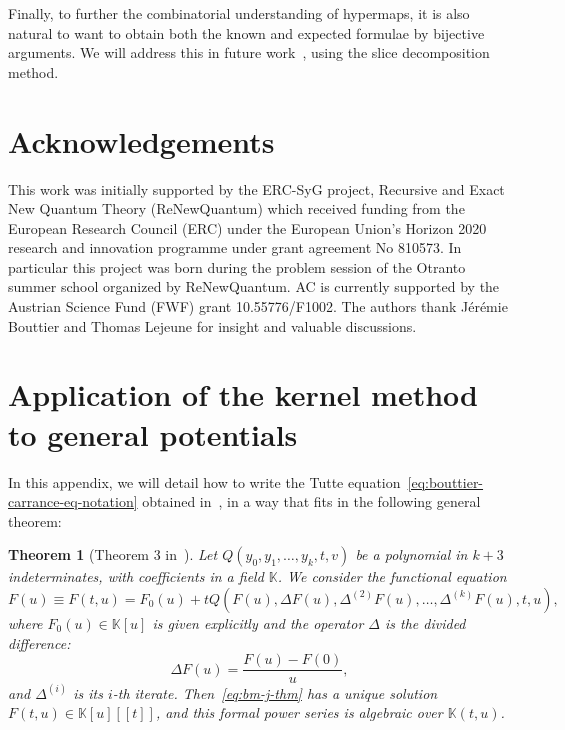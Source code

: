 \documentclass{scrartcl}
\newcommand{\K}{\mathbb{K}}
\newtheorem{thm}{Theorem}[section]
\begin{document}
Finally, to further the combinatorial understanding of hypermaps,  it is also natural to want to obtain both the known and expected formulae by bijective arguments. We will address this in future work~\cite{slices-alt}, using the slice decomposition method.




\section*{Acknowledgements}

This work was initially supported by the ERC-SyG project, Recursive and Exact New Quantum Theory (ReNewQuantum) which received funding from the European Research Council (ERC) under the European Union's Horizon 2020 research and innovation programme under grant agreement No 810573.
In particular this project was born during the problem session of the Otranto summer school organized by ReNewQuantum. AC is currently supported by the Austrian Science Fund (FWF) grant 10.55776/F1002. The authors thank Jérémie Bouttier and Thomas Lejeune for insight and valuable discussions.


\appendix

\section{Application of the kernel method to general potentials}
\label{sec:appendix-alg-by-bmj}

In this appendix, we will detail how to write the Tutte equation~\eqref{eq:bouttier-carrance-eq-notation} obtained in~\cite{bouttier-carrance}, in a way that fits in the following general theorem:

\begin{thm}[Theorem 3 in~\cite{BoJe06}]
Let $Q(y_0,y_1,\dots,y_k,t,v)$ be a polynomial in $k+3$ indeterminates, with coefficients in a field $\K$. We consider the functional equation
\begin{equation}
F(u)\equiv F(t,u)=F_0(u)+tQ(F(u),\Delta F(u), \Delta^{(2)}F(u), \dots, \Delta^{(k)}F(u),t,u),
\label{eq:bm-j-thm}
\end{equation}
where $F_0(u) \in \K[u]$ is given explicitly and the operator $\Delta$ is the divided difference:
\[
\Delta F(u)=\frac{F(u)-F(0)}{u},
\]
and $\Delta^{(i)}$ is its $i$-th iterate. Then~\eqref{eq:bm-j-thm} has a unique solution $F(t,u) \in \K[u][[t]]$, and this formal power series is algebraic over $\K(t,u)$.
\label{thm:bmj}
\end{thm}
\end{document}

